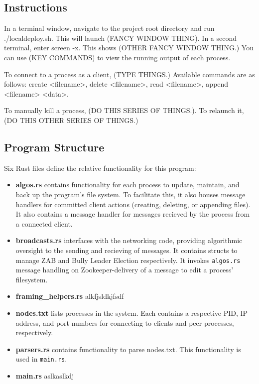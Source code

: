 \documentclass{article}
\begin{document}
\subsection*{Instructions}
    In a terminal window, navigate to the project root directory and run ./localdeploy.sh. This will launch (FANCY WINDOW THING). In a second terminal, enter screen -x. This shows (OTHER FANCY WINDOW THING.) You can use (KEY COMMANDS) to view the running output of each process.

    To connect to a process as a client, (TYPE THINGS.) Available commands are as follows: create <filename>, delete <filename>, read <filename>, append <filename> <data>.

    To manually kill a process, (DO THIS SERIES OF THINGS.). To relaunch it, (DO THIS OTHER SERIES OF THINGS.)

\subsection*{Program Structure}
    Six Rust files define the relative functionality for this program:
	\begin{itemize}
	        \item\textbf{algos.rs} contains functionality for each process to update, maintain, and back up the program's file system. To facilitate this, it also houses message handlers for committed client actions (creating, deleting, or appending files). It also contains a message handler for messages recieved by the process from a connected client.
	        \item\textbf{broadcasts.rs} interfaces with the networking code, providing algorithmic oversight to the sending and recieving of messages. It contains structs to manage ZAB and Bully Leader Election respectively. It invokes \verb|algos.rs| message handling on Zookeeper-delivery of a message to edit a process' filesystem.
	        \item\textbf{framing\_helpers.rs} alkfjsldkjfsdf
	        \item\textbf{nodes.txt} lists processes in the system. Each contains a respective PID, IP address, and port numbers for connecting to clients and peer processes, respectively.
	        \item\textbf{parsers.rs} contains functionality to parse nodes.txt. This functionality is used in \verb|main.rs|.
	        \item\textbf{main.rs} aslkaslkdj
	\end{itemize}
\end{document}
